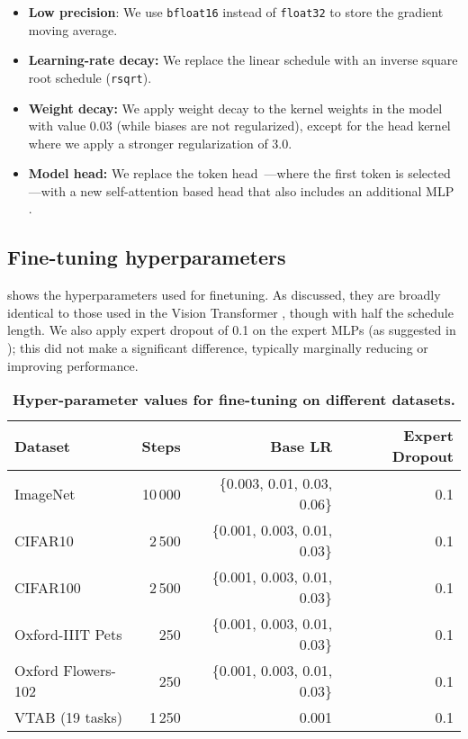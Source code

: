 \documentclass{article}
\begin{document}
\begin{itemize}
    \item \textbf{Low precision}: We use \texttt{bfloat16} instead of \texttt{float32} to store the gradient moving average.
    \item \textbf{Learning-rate decay:} We replace the linear schedule with an inverse square root schedule (\texttt{rsqrt}).
    \item \textbf{Weight decay:} We apply weight decay to the kernel weights in the model with value 0.03 (while biases are not regularized), except for the head kernel where we apply a stronger regularization of 3.0.
    \item \textbf{Model head:} We replace the token head~\cite{dosovitskiy2020image}---where the first token is selected---with a new self-attention based head that also includes an additional MLP \cite{zhai2021scaling}.
\end{itemize}

\subsection{Fine-tuning hyperparameters}\label{sec:finetune_hparams}
 shows the hyperparameters used for finetuning. As discussed, they are broadly identical to those used in the Vision Transformer \cite{dosovitskiy2020image}, though with half the schedule length. We also apply expert dropout of 0.1 on the expert MLPs (as suggested in \cite{fedus2021switch}); this did not make a significant difference, typically marginally reducing or improving performance.
\begin{table}[tb]
\centering
\caption{
\label{tab:finetune_hparams} \textbf{Hyper-parameter values for fine-tuning on different datasets.}}
\begin{tabular}{lrrr}
\toprule
Dataset  & Steps & Base LR & Expert Dropout \\
\midrule
ImageNet & 10\,000 & \{0.003, 0.01, 0.03, 0.06\} & 0.1\\
CIFAR10  & 2\,500  & \{0.001, 0.003, 0.01, 0.03\} & 0.1\\
CIFAR100 & 2\,500  & \{0.001, 0.003, 0.01, 0.03\} & 0.1\\
Oxford-IIIT Pets & 250 & \{0.001, 0.003, 0.01, 0.03\} & 0.1\\
Oxford Flowers-102 & 250 & \{0.001, 0.003, 0.01, 0.03\} & 0.1\\
VTAB (19 tasks) & 1\,250 & 0.001 & 0.1\\
\bottomrule     
\end{tabular}
\end{table}
\end{document}
